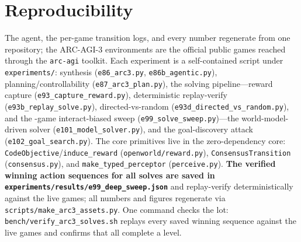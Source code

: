 \documentclass[11pt]{article}
\begin{document}
\section{Reproducibility}
\label{sec:reproducibility}
The agent, the per-game transition logs, and every number regenerate from one repository; the
ARC-AGI-3 environments are the official public games reached through the \texttt{arc-agi} toolkit. Each
experiment is a self-contained script under \texttt{experiments/}: synthesis (\texttt{e86\_arc3.py},
\texttt{e86b\_agentic.py}), planning/controllability (\texttt{e87\_arc3\_plan.py}), the solving
pipeline---reward capture (\texttt{e93\_capture\_reward.py}), deterministic replay-verify
(\texttt{e93b\_replay\_solve.py}), directed-vs-random (\texttt{e93d\_directed\_vs\_random.py}), and the
\ArcNSolved-game interact-biased sweep (\texttt{e99\_solve\_sweep.py})---the world-model-driven solver
(\texttt{e101\_model\_solver.py}), and the goal-discovery attack (\texttt{e102\_goal\_search.py}). The
core primitives live in the zero-dependency core: \texttt{CodeObjective}/\texttt{induce\_reward}
(\texttt{openworld/reward.py}), \texttt{ConsensusTransition} (\texttt{consensus.py}), and
\texttt{make\_typed\_perceptor} (\texttt{perceive.py}). \textbf{The verified winning action sequences
for all \ArcNSolved{} solves are saved in \texttt{experiments/results/e99\_deep\_sweep.json}} and
replay-verify deterministically against the live games; all numbers and figures regenerate via
\texttt{scripts/make\_arc3\_assets.py}. One command checks the lot:
\texttt{bench/verify\_arc3\_solves.sh} replays every saved winning sequence against the live games
and confirms that all \ArcNSolved{} complete a level.
\end{document}
